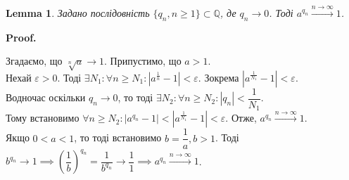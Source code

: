 \documentclass[a4paper, 14pt]{article}
\makeatletter
\def\qed{$\blacksquare$}
\theoremstyle{theoremdd}
\theoremstyle{theoremdd}
\theoremstyle{theoremdd}
\theoremstyle{theoremdd}
\theoremstyle{theoremdd}
\theoremstyle{theoremdd}
\theoremstyle{theoremdd}
\newtheorem{lemma}[theorem]{Lemma}
\theoremstyle{theoremdd}
\renewenvironment{proof}[1][Proof.\\]{\par
\pushQED{\hfill \qed}%
\normalfont \topsep6\p@\@plus6\p@\relax
\trivlist
\item\relax
{\bfseries
#1\@addpunct{.}}\hspace\labelsep\ignorespaces
}{%
\popQED\endtrivlist\@endpefalse
}
\makeatother
\begin{document}
\begin{lemma}
Задано послідовність $\{q_n, n \geq 1\} \subset \mathbb{Q}$, де $q_n \to 0$. Тоді $a^{q_n} \overset{n \to \infty}{\longrightarrow} 1$.
\end{lemma}

\begin{proof}
Згадаємо, що $\sqrt[n]{a} \to 1$. Припустимо, що $a > 1$.\\
Нехай $\varepsilon > 0$. Тоді $\exists N_1: \forall n \geq N_1: |a^{\frac{1}{n}} - 1| < \varepsilon$. Зокрема $|a^{\frac{1}{N_1}}-1|<\varepsilon$.\\
Водночас оскільки $q_n \to 0$, то тоді $\exists N_2: \forall n \geq N_2: |q_n| < \dfrac{1}{N_1}$.\\
Тому встановимо $\forall n \geq N_2: |a^{q_n}-1| < |a^{\frac{1}{N_1}} - 1| < \varepsilon$. Отже, $a^{q_n} \overset{n \to \infty}{\longrightarrow} 1$.\\
Якщо $0 < a < 1$, то тоді встановимо $b = \dfrac{1}{a}, b > 1$. Тоді \\ $b^{q_n} \to 1 \implies \left(\dfrac{1}{b} \right)^{q_n} = \dfrac{1}{b^{q_n}} \to \dfrac{1}{1} \implies a^{q_n} \overset{n \to \infty}{\longrightarrow} 1$.
\end{proof}

\iffalse
\begin{lemma}
$|a^q-1| \leq 2|q|(a-1)$, якщо $a>1$ та $q \in \mathbb{Q}: |q| \leq 1$.
\end{lemma}

\begin{proof}
1) Розглянемо дріб $q = \dfrac{1}{n}, n \in \mathbb{N}$. Позначимо $\alpha = a^{\frac{1}{n}}-1 > 0$. Тоді за нерівністю Бернуллі,\\
$(1+\alpha)^n \geq 1 + \alpha n \implies a \geq 1 + \alpha n$.\\
$\alpha = a^{\frac{1}{n}} - 1 \leq \dfrac{1}{n}(a-1) < 2 \dfrac{1}{n} (a-1) \implies |a^q-1| < 2q(a-1)$ - та сама нерівність.
\bigskip \\
2) Нехай тепер маємо будь-яке раціональне число $0 < q < 1$. Тоді знайдеться таке $n \in \mathbb{N}$, що $\dfrac{1}{n+1} < q < \dfrac{1}{n}$. А тому $|a^q - 1| < |a^{\frac{1}{n}} - 1| \leq \dfrac{1}{n}(a-1) < 2r(a-1)$.
\bigskip \\
3) Нарешті, $-1 < q < 0$, але ми робимо заміну $r = -q$ - приходимо до 2), тоді $a^r - 1 < 2r(a-1)$\\
$a^{-q} - 1 < 2(-q)(a-1) \implies 1-a^q = |a^q-1| < 2|q|(a-1)a^q < 2|q|(a-1)$
\end{proof}
\fi
\end{document}
